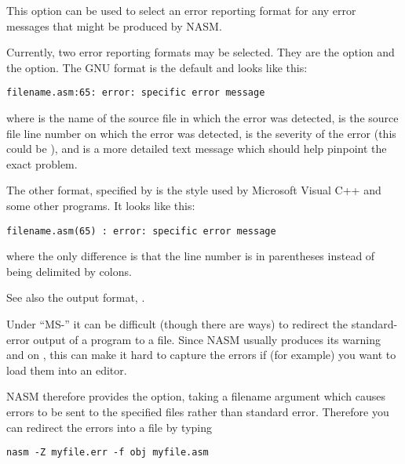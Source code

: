 
This option can be used to select an error reporting format for any
error messages that might be produced by NASM.

Currently, two error reporting formats may be selected. They are
the  option and the  option.
The GNU format is the default and looks like this:

\begin{lstlisting}
filename.asm:65: error: specific error message
\end{lstlisting}

where  is the name of the source file in
which the error was detected,  is the source file
line number on which the error was detected, 
is the severity of the error (this could be ),
and  is a more detailed text message
which should help pinpoint the exact problem.

The other format, specified by  is the style used by
Microsoft Visual C++ and some other programs. It looks like this:

\begin{lstlisting}
filename.asm(65) : error: specific error message
\end{lstlisting}

where the only difference is that the line number is in parentheses
instead of being delimited by colons.

See also the  output format, .


Under ``MS-'' it can be difficult (though there are
ways) to redirect the standard-error output of a program to a file.
Since NASM usually produces its warning and 
on , this can make it hard to capture the
errors if (for example) you want to load them into an editor.

NASM therefore provides the  option, taking a filename argument
which causes errors to be sent to the specified files rather than standard
error. Therefore you can redirect the errors
into a file by typing

\begin{lstlisting}
nasm -Z myfile.err -f obj myfile.asm
\end{lstlisting}

